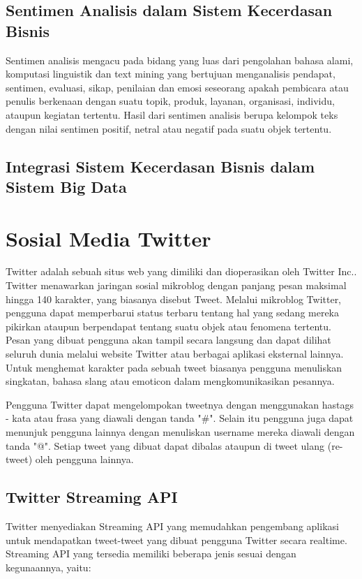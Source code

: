 \subsection{Sentimen Analisis dalam Sistem Kecerdasan Bisnis}
\label{sec:sentimen_analisis}
Sentimen analisis mengacu pada bidang yang luas dari pengolahan bahasa alami, komputasi linguistik dan text mining yang bertujuan menganalisis pendapat, sentimen, evaluasi, sikap, penilaian dan emosi seseorang apakah pembicara atau penulis berkenaan dengan suatu topik, produk, layanan, organisasi, individu, ataupun kegiatan tertentu. \cite{liu2012sentiment} Hasil dari sentimen analisis berupa kelompok teks dengan nilai sentimen positif, netral atau negatif pada suatu objek tertentu.

\subsection{Integrasi Sistem Kecerdasan Bisnis dalam Sistem Big Data}
\label{sec:integrasi_kecerdasan_bisnis}

\section{Sosial Media Twitter}
\label{sec:twitter}
Twitter adalah sebuah situs web yang dimiliki dan dioperasikan oleh Twitter Inc.. Twitter menawarkan jaringan sosial mikroblog dengan panjang pesan maksimal hingga 140 karakter, yang biasanya disebut Tweet. Melalui mikroblog Twitter, pengguna dapat memperbarui status terbaru tentang hal yang sedang mereka pikirkan ataupun berpendapat tentang suatu objek atau fenomena tertentu. Pesan yang dibuat pengguna akan tampil secara langsung dan dapat dilihat seluruh dunia melalui website Twitter atau berbagai aplikasi eksternal lainnya. Untuk menghemat karakter pada sebuah tweet biasanya pengguna menuliskan singkatan, bahasa slang atau emoticon dalam mengkomunikasikan pesannya. 

Pengguna Twitter dapat mengelompokan tweetnya dengan menggunakan hastags - kata atau frasa yang diawali dengan tanda "\#". Selain itu pengguna juga dapat menunjuk pengguna lainnya dengan menuliskan username mereka diawali dengan tanda "@". Setiap tweet yang dibuat dapat dibalas ataupun di tweet ulang (re-tweet) oleh pengguna lainnya.

\subsection{Twitter Streaming API}
\label{sec:twitter_streaming_api}
Twitter menyediakan Streaming API yang memudahkan pengembang aplikasi untuk mendapatkan tweet-tweet yang dibuat pengguna Twitter secara realtime. Streaming API yang tersedia memiliki beberapa jenis sesuai dengan kegunaannya, yaitu:

